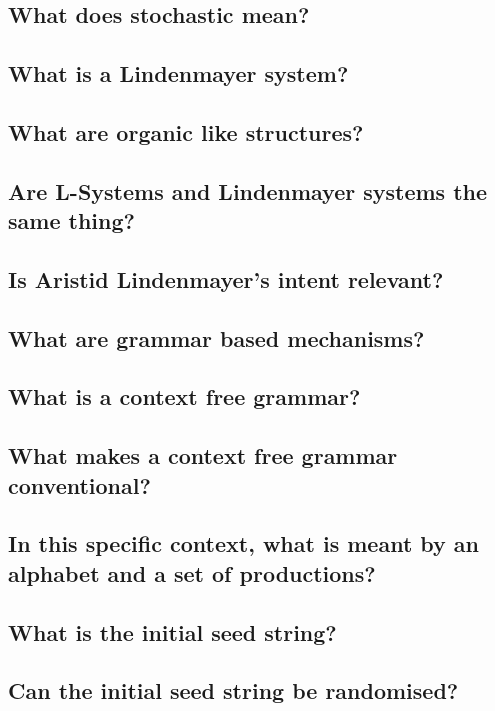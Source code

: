 \documentclass[11pt]{report}
\begin{document}
\subsection{What does stochastic mean?}

\subsection{What is a Lindenmayer system?}

\subsection{What are organic like structures?}

\subsection{Are L-Systems and Lindenmayer systems the same thing?}

\subsection{Is Aristid Lindenmayer's intent relevant?}

\subsection{What are grammar based mechanisms?}

\subsection{What is a context free grammar?}

\subsection{What makes a context free grammar conventional?}

\subsection{In this specific context, what is meant by an alphabet and a set of
    productions?}

\subsection{What is the initial seed string?}

\subsection{Can the initial seed string be randomised?}
\end{document}
